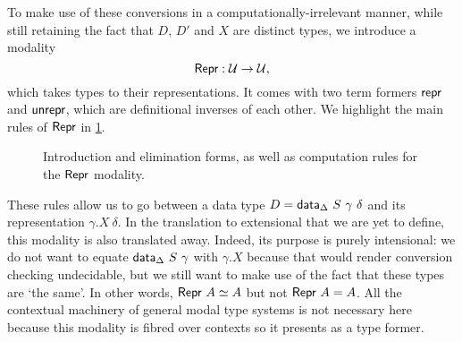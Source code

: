 To make use of these conversions in a computationally-irrelevant manner,
while still retaining the fact that $D$, $D'$ and $X$ are distinct types,
we introduce a modality
$$
\textsf{Repr} : \mathcal{U} \to \mathcal{U} ,
$$
which takes types to their representations. It comes with two term formers
$\textsf{repr}$ and $\textsf{unrepr}$, which are definitional inverses of each other. We
highlight the main rules of $\textsf{Repr}$ in \cref{fig:repr-rules}.

\begin{figure}[H]
\caption{Introduction and elimination forms, as well as computation rules
for the $\textsf{Repr}$ modality.}
\label{fig:repr-rules}
\end{figure}

These rules allow us to go between a data type $D = \textsf{data}_\Delta\ S\ \gamma\
\delta$ and its representation $\gamma.X\ \delta$. In the translation to
extensional \lambdamltt that we are yet to define, this modality is also
translated away. Indeed, its purpose is purely intensional: we do not want to
equate $\textsf{data}_\Delta\ S\ \gamma$ with $\gamma.X$ because that would render
conversion checking undecidable, but we still want to make use of the fact that
these types are `the same'. In other words, $\textsf{Repr}\ A \simeq A$ but not
$\textsf{Repr}\ A = A$. All the contextual machinery of general modal type systems
\cite{Gratzer2020-kf} is not necessary here because this modality is fibred over
contexts so it presents as a type former.

